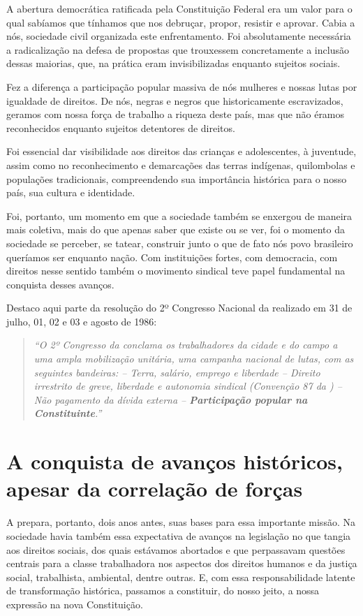 A abertura democrática ratificada pela Constituição Federal era um valor
para o qual sabíamos que tínhamos que nos debruçar, propor, resistir e
aprovar. Cabia a nós, sociedade civil organizada este enfrentamento. Foi
absolutamente necessária a radicalização na defesa de propostas que
trouxessem concretamente a inclusão dessas maiorias, que, na prática
eram invisibilizadas enquanto sujeitos sociais.

Fez a diferença a participação popular massiva de nós mulheres e nossas
lutas por igualdade de direitos. De nós, negras e negros que
historicamente escravizados, geramos com nossa força de trabalho a
riqueza deste país, mas que não éramos reconhecidos enquanto sujeitos
detentores de direitos.

Foi essencial dar visibilidade aos direitos das crianças e adolescentes,
à juventude, assim como no reconhecimento e demarcações das terras
indígenas, quilombolas e populações tradicionais, compreendendo sua
importância histórica para o nosso país, sua cultura e identidade.

Foi, portanto, um momento em que a sociedade também se enxergou de
maneira mais coletiva, mais do que apenas saber que existe ou se ver,
foi o momento da sociedade se perceber, se tatear, construir junto o que
de fato nós povo brasileiro queríamos ser enquanto nação. Com
instituições fortes, com democracia, com direitos nesse sentido também o
movimento sindical teve papel fundamental na conquista desses avanços.

Destaco aqui parte da resolução do 2º Congresso Nacional da 
realizado em 31 de julho, 01, 02 e 03 e agosto de 1986:

\begin{quote}
\emph{``O 2º Congresso da  conclama os trabalhadores da cidade e do
campo a uma ampla mobilização unitária, uma campanha nacional de lutas,
com as seguintes bandeiras: -- Terra, salário, emprego e liberdade --
Direito irrestrito de greve, liberdade e autonomia sindical (Convenção
87 da ) -- Não pagamento da dívida externa -- \textbf{Participação
popular na Constituinte}.'' }
\end{quote}

\section{A conquista de avanços históricos, apesar da correlação de
forças}

A  prepara, portanto, dois anos antes, suas bases para essa
importante missão. Na sociedade havia também essa expectativa de avanços
na legislação no que tangia aos direitos sociais, dos quais estávamos
abortados e que perpassavam questões centrais para a classe trabalhadora
nos aspectos dos direitos humanos e da justiça social, trabalhista,
ambiental, dentre outras. E, com essa responsabilidade latente de
transformação histórica, passamos a constituir, do nosso jeito, a nossa
expressão na nova Constituição.

